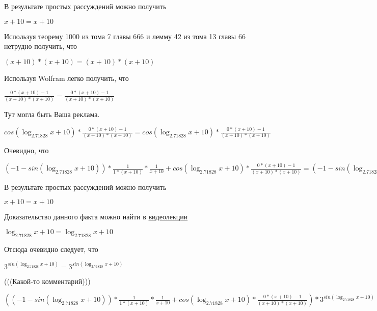 \documentclass[12pt,a4paper,fleqn]{article}
\theoremstyle{definition}
\begin{document}
В результате простых рассуждений можно получить 

$ x  +  10  =  x  +  10 $

Используя теорему 1000 из тома 7 главы 666 и лемму 42 из тома 13 главы 66 нетрудно получить, что 

$( x  +  10 ) * ( x  +  10 ) = ( x  +  10 ) * ( x  +  10 )$

Используя Wolfram легко получить, что 

$\frac{ 0  * ( x  +  10 ) -  1 }{( x  +  10 ) * ( x  +  10 )}
 = \frac{ 0  * ( x  +  10 ) -  1 }{( x  +  10 ) * ( x  +  10 )}
$

Тут могла быть Ваша реклама. 

$cos(\log_{ 2.71828 }{ x  +  10 }) * \frac{ 0  * ( x  +  10 ) -  1 }{( x  +  10 ) * ( x  +  10 )}
 = cos(\log_{ 2.71828 }{ x  +  10 }) * \frac{ 0  * ( x  +  10 ) -  1 }{( x  +  10 ) * ( x  +  10 )}
$

Очевидно, что 

$( -1  - sin(\log_{ 2.71828 }{ x  +  10 })) * \frac{ 1 }{ 1  * ( x  +  10 )}
 * \frac{ 1 }{ x  +  10 }
 + cos(\log_{ 2.71828 }{ x  +  10 }) * \frac{ 0  * ( x  +  10 ) -  1 }{( x  +  10 ) * ( x  +  10 )}
 = ( -1  - sin(\log_{ 2.71828 }{ x  +  10 })) * \frac{ 1 }{ 1  * ( x  +  10 )}
 * \frac{ 1 }{ x  +  10 }
 + cos(\log_{ 2.71828 }{ x  +  10 }) * \frac{ 0  * ( x  +  10 ) -  1 }{( x  +  10 ) * ( x  +  10 )}
$

В результате простых рассуждений можно получить 

$ x  +  10  =  x  +  10 $

Доказательство данного факта можно найти в \href{https://www.youtube.com/watch?v=dQw4w9WgXcQ}{видеолекции} 

$\log_{ 2.71828 }{ x  +  10 } = \log_{ 2.71828 }{ x  +  10 }$

Отсюда очевидно следует, что 

${ 3 }^{sin(\log_{ 2.71828 }{ x  +  10 })} = { 3 }^{sin(\log_{ 2.71828 }{ x  +  10 })}$

(((Какой-то комментарий))) 

$(( -1  - sin(\log_{ 2.71828 }{ x  +  10 })) * \frac{ 1 }{ 1  * ( x  +  10 )}
 * \frac{ 1 }{ x  +  10 }
 + cos(\log_{ 2.71828 }{ x  +  10 }) * \frac{ 0  * ( x  +  10 ) -  1 }{( x  +  10 ) * ( x  +  10 )}
) * { 3 }^{sin(\log_{ 2.71828 }{ x  +  10 })} = (( -1  - sin(\log_{ 2.71828 }{ x  +  10 })) * \frac{ 1 }{ 1  * ( x  +  10 )}
 * \frac{ 1 }{ x  +  10 }
 + cos(\log_{ 2.71828 }{ x  +  10 }) * \frac{ 0  * ( x  +  10 ) -  1 }{( x  +  10 ) * ( x  +  10 )}
) * { 3 }^{sin(\log_{ 2.71828 }{ x  +  10 })}$
\end{document}
